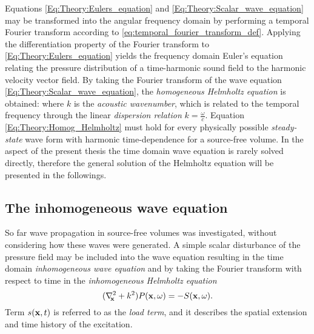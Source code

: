 \vspace{3mm}
%
Equations \eqref{Eq:Theory:Eulers_equation} and \eqref{Eq:Theory:Scalar_wave_equation} may be transformed into the angular frequency domain by performing a temporal Fourier transform according to \eqref{eq:temporal_fourier_transform_def}.
Applying the differentiation property of the Fourier transform to \eqref{Eq:Theory:Eulers_equation} yields the frequency domain Euler's equation
relating the pressure distribution of a time-harmonic sound field to the harmonic velocity vector field.
By taking the Fourier transform of the wave equation \eqref{Eq:Theory:Scalar_wave_equation}, the \emph{homogeneous Helmholtz equation} is obtained:
where $k$ is the \emph{acoustic wavenumber}, which is related to the temporal frequency through the linear \emph{dispersion relation} $k = \frac{\omega}{c}$.
%
Equation \eqref{Eq:Theory:Homog_Helmholtz} must hold for every physically possible \emph{steady-state} wave form with harmonic time-dependence for a source-free volume. 
In the aspect of the present thesis the time domain wave equation is rarely solved directly, therefore the general solution of the Helmholtz equation will be presented in the followings.

\subsection{The inhomogeneous wave equation}
%
So far wave propagation in source-free volumes was investigated, without considering how these waves were generated.
A simple scalar disturbance of the pressure field may be included into the wave equation resulting in the time domain \emph{inhomogeneous wave equation}  
and by taking the Fourier transform with respect to time in the \emph{inhomogeneous Helmholtz equation}
\begin{equation}
(\nabla^2_{\!\!\mathbf{x}} + k^2 ) P(\mathbf{x},\omega ) = -S(\mathbf{x},\omega).
\end{equation}
Term $s(\mathbf{x},t)$ is referred to as the \emph{load term}, and it describes the spatial extension and time history of the excitation.

